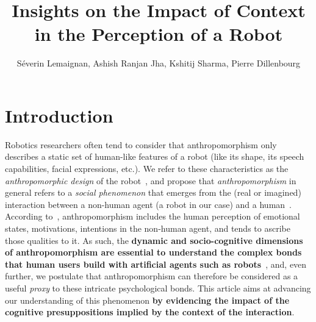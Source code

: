 \documentclass[lettersize, apacite, twoside, HRI]{apa_HRI}
\title{Insights on the Impact of Context in the Perception of a Robot}
\author{Séverin Lemaignan, Ashish Ranjan Jha, Kshitij Sharma, Pierre
Dillenbourg}
\affiliation{CHILI Lab, École Polytechnique Fédérale de Lausanne}
\begin{document}
\maketitle

\section{Introduction}

Robotics researchers often tend to consider that anthropomorphism only describes
a static set of human-like features of a robot (like its shape, its speech
capabilities, facial expressions, etc.). We refer to these characteristics as
the \emph{anthropomorphic design} of the
robot~\cite{fink_anthropomorphism_2012}, and propose that
\emph{anthropomorphism} in general refers to a \emph{social phenomenon} that
emerges from the (real or imagined) interaction between a non-human agent (a
robot in our case) and a human~\cite{persson_anthropomorphism_2000}.  According
to~\cite{epley_when_2008}, anthropomorphism includes the human perception of
emotional states, motivations, intentions in the non-human agent, and tends to
ascribe those qualities to it. As such, the \textbf{dynamic and socio-cognitive
dimensions of anthropomorphism are essential to understand the complex bonds
that human users build with artificial agents such as
robots}~\cite{lemaignan2014dynamics}, and, even further, we postulate that
anthropomorphism can therefore be considered as a useful \emph{proxy} to these
intricate psychological bonds. This article aims at advancing our understanding
of this phenomenon \textbf{by evidencing the impact of the cognitive
presuppositions implied by the context of the interaction}.
\end{document}
